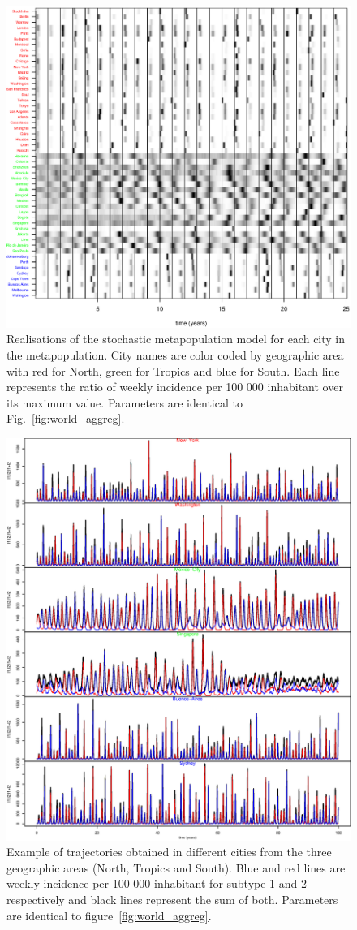 \begin{figure}[htb]
  \center
  \includegraphics[width= 0.8 \linewidth]{texte/article2/graph_annexe/image_upca.eps}
  \caption{Realisations of the stochastic
    metapopulation model for each city in the metapopulation. City names are color coded by geographic area
    with red for North, green for Tropics and blue for South. Each line represents the ratio of weekly
    incidence per 100 000 inhabitant over its maximum value.
    Parameters are identical to Fig.~\ref{fig:world_aggreg}.}
  \label{fig:image_upca}
\end{figure}

\begin{figure}[htb]
  \center
  \includegraphics[width= 0.8 \linewidth]{texte/article2/graph_annexe/traj_upca_metapop.eps}
  \caption{Example of trajectories obtained in different cities from the
    three geographic areas (North, Tropics and South). Blue and red lines
    are weekly incidence per 100 000 inhabitant for subtype 1 and 2
    respectively and black lines represent the sum of both. Parameters are identical to
    figure~\ref{fig:world_aggreg}.}
  \label{fig:traj_upca_metapop}
\end{figure}


